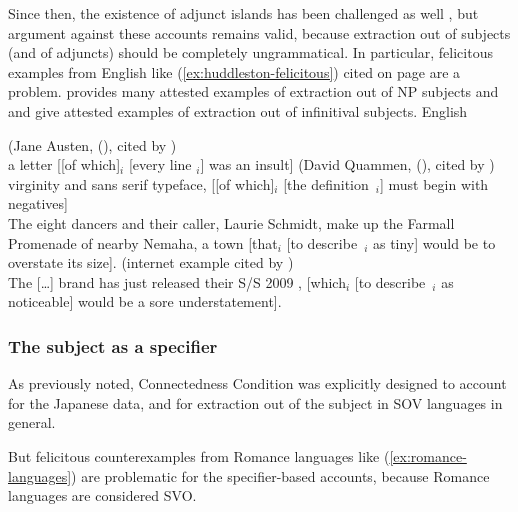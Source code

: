 Since then, the existence of adjunct islands has been challenged as well \citep{Truswell.2011}, but  argument against these accounts remains valid, because extraction out of subjects (and of adjuncts) should be completely ungrammatical. In particular, felicitous examples from English like (\ref{ex:huddleston-felicitous}) cited on page \pageref{ex:huddleston-felicitous} are a problem. \citeauthor{Santorini.2017} provides many attested examples of extraction out of NP subjects and \citeauthor{Huddleston.2002} and \citet[17--18]{Chaves.2012} give attested examples of extraction out of infinitival subjects.
\ea English \label{ex:English}
\begin{xlist}
\ex (Jane Austen,  (\citeyear[p. 84]{Austen1981}), cited by \citealt{Santorini.2017})\\
a letter [[of which]$_i$ [every line \trace{}$_i$] was an insult] 
\ex (David Quammen,  (\citeyear[p. 176]{Quammen1985}), cited by \citealt{Santorini.2017})\\
virginity and sans serif typeface, [[of which]$_i$ [the definition~\trace{}$_i$] must begin with negatives] 
\ex \citep[1094]{Huddleston.2002}\\
The eight dancers and their caller, Laurie Schmidt, make up the Farmall Promenade of nearby Nemaha, a town [that$_i$ [to describe~\trace{}$_i$ as tiny] would be to overstate its size]. 
\ex (internet example cited by \citealt[18]{Chaves.2012})\\
The [\dots] brand has just released their S/S 2009 , [which$_i$ [to describe~\trace{}$_i$ as noticeable] would be a sore understatement]. 
\end{xlist}
\z 

\subsubsection{The subject as a specifier}

As previously noted,  Connectedness Condition was explicitly designed to account for the Japanese data, and for extraction out of the subject in SOV languages in general.

But felicitous counterexamples from Romance languages like (\ref{ex:romance-languages}) are problematic for the specifier-based accounts, because Romance languages are considered SVO.

